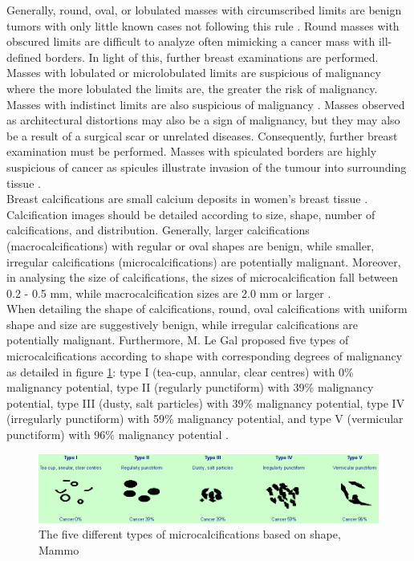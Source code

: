 	 Generally, round, oval, or lobulated masses with circumscribed limits are benign tumors with only little known cases not following this rule \cite{regularBreastMasses}. Round masses with obscured limits are difficult to analyze often mimicking a cancer mass with ill-defined borders. In light of this, further breast examinations are performed. Masses with lobulated or microlobulated limits are suspicious of malignancy where the more lobulated the limits are, the greater the risk of malignancy. Masses with indistinct limits are also suspicious of malignancy \cite{irregularBreastMasses}. Masses observed as architectural distortions may also be a sign of malignancy, but they may also be a result of a surgical scar or unrelated diseases. Consequently, further breast examination must be performed. Masses with spiculated borders are highly suspicious of cancer as spicules illustrate invasion of the tumour into surrounding tissue \cite{irregularMasses}. \\

	Breast calcifications are small calcium deposits in women's breast tissue \cite{breastCalcification}. Calcification images should be detailed according to size, shape, number of calcifications, and distribution. Generally, larger calcifications (macrocalcifications) with regular or oval shapes are benign, while smaller, irregular calcifications (microcalcifications) are potentially malignant. Moreover, in analysing the size of calcifications, the sizes of microcalcification fall between 0.2 - 0.5 mm, while macrocalcification sizes are 2.0 mm or larger \cite{mammaryCalcifications}. \\

	When detailing the shape of calcifications, round, oval calcifications with uniform shape and size are suggestively benign, while irregular calcifications are potentially malignant. Furthermore, M. Le Gal proposed five types of microcalcifications according to shape with corresponding degrees of malignancy as detailed in figure \ref{fig:mammogramCalcificationTypes}: type I (tea-cup, annular, clear centres) with 0\% malignancy potential, type II (regularly punctiform) with 39\% malignancy potential, type III (dusty, salt particles) with 39\% malignancy potential, type IV (irregularly punctiform) with 59\% malignancy potential, and type V (vermicular punctiform) with 96\% malignancy potential \cite{mammaryCalcifications}.

\begin{figure}[h]
	\centering
  	\includegraphics[scale=0.6]{images/mammogramCalcificationTypes.png}
	 \caption{The five different types of microcalcifications based on shape, Mammo}
  	\label{fig:mammogramCalcificationTypes}
\end{figure}

